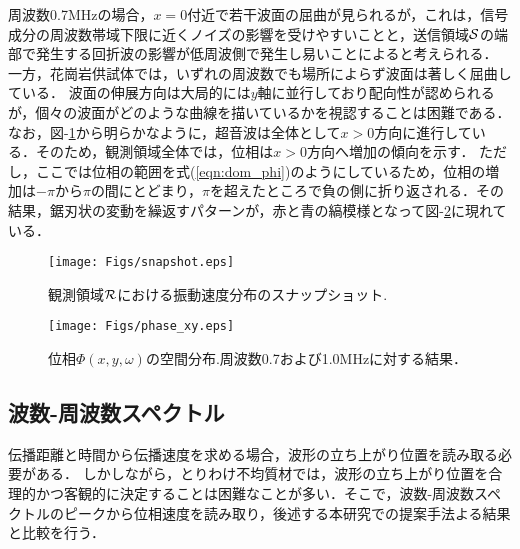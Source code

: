 周波数0.7MHzの場合，$x=0$付近で若干波面の屈曲が見られるが，これは，信号成分の周波数帯域下限に近くノイズの影響を受けやすいことと，送信領域$\cal S$の端部で発生する回折波の影響が低周波側で発生し易いことによると考えられる．
一方，花崗岩供試体では，いずれの周波数でも場所によらず波面は著しく屈曲している．
波面の伸展方向は大局的には$y$軸に並行しており配向性が認められるが，個々の波面がどのような曲線を描いているかを視認することは困難である．なお，図-\ref{fig:fig5}から明らかなように，超音波は全体として$x>0$方向に進行している．そのため，観測領域全体では，位相は$x>0$方向へ増加の傾向を示す．
ただし，ここでは位相の範囲を式(\ref{eqn:dom_phi})のようにしているため，位相の増加は$-\pi$から$\pi$の間にとどまり，$\pi$を超えたところで負の側に折り返される．その結果，鋸刃状の変動を繰返すパターンが，赤と青の縞模様となって図-\ref{fig:fig6}に現れている．
\begin{figure}
\begin{center}
	\texttt{[image: Figs/snapshot.eps]}
\caption{
	観測領域${\cal R}$における振動速度分布のスナップショット.
}
\label{fig:fig5}
\end{center}
\end{figure}
\begin{figure}
\begin{center}
	\texttt{[image: Figs/phase\_xy.eps]}
	\caption{位相$\Phi(x,y,\omega)$の空間分布.周波数0.7および1.0MHzに対する結果．}
	\label{fig:fig6}
\end{center}
\end{figure}
\subsection{波数-周波数スペクトル}
伝播距離と時間から伝播速度を求める場合，波形の立ち上がり位置を読み取る必要がある．
しかしながら，とりわけ不均質材では，波形の立ち上がり位置を合理的かつ客観的に決定することは困難なことが多い．そこで，波数-周波数スペクトルのピークから位相速度を読み取り，後述する本研究での提案手法よる結果と比較を行う．

